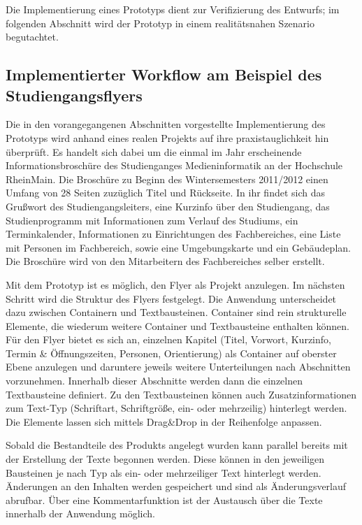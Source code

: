 \secbar

Die Implementierung eines Prototyps dient zur Verifizierung des Entwurfs; im folgenden Abschnitt wird der Prototyp in einem realitätsnahen Szenario begutachtet.

\pagebreak

\subsection{Implementierter Workflow am Beispiel des Studiengangsflyers}

Die in den vorangegangenen Abschnitten vorgestellte Implementierung des Prototyps wird anhand eines realen Projekts auf ihre praxistauglichkeit hin überprüft. Es handelt sich dabei um die einmal im Jahr erscheinende Informationsbroschüre des Studienganges Medieninformatik an der Hochschule RheinMain. Die Broschüre zu Beginn des Wintersemesters 2011/2012 einen Umfang von 28 Seiten zuzüglich Titel und Rückseite. In ihr findet sich das Grußwort des Studiengangsleiters, eine Kurzinfo über den Studiengang, das Studienprogramm mit Informationen zum Verlauf des Studiums, ein Terminkalender, Informationen zu Einrichtungen des Fachbereiches, eine Liste mit Personen im Fachbereich, sowie eine Umgebungskarte und ein Gebäudeplan. Die Broschüre wird von den Mitarbeitern des Fachbereiches selber erstellt.

\bigskip

Mit dem Prototyp ist es möglich, den Flyer als Projekt anzulegen. Im nächsten Schritt wird die Struktur des Flyers festgelegt. Die Anwendung unterscheidet dazu zwischen Containern und Textbausteinen. Container sind rein strukturelle Elemente, die wiederum weitere Container und Textbausteine enthalten können. Für den Flyer bietet es sich an, einzelnen Kapitel (Titel, Vorwort, Kurzinfo, Termin \& Öffnungszeiten, Personen, Orientierung) als Container auf oberster Ebene anzulegen und daruntere jeweils weitere Unterteilungen nach Abschnitten vorzunehmen. Innerhalb dieser Abschnitte werden dann die einzelnen Textbausteine definiert. Zu den Textbausteinen können auch Zusatzinformationen zum Text-Typ (Schriftart, Schriftgröße, ein- oder mehrzeilig) hinterlegt werden. Die Elemente lassen sich mittels Drag\&Drop in der Reihenfolge anpassen.

Sobald die Bestandteile des Produkts angelegt wurden kann parallel bereits mit der Erstellung der Texte begonnen werden. Diese können in den jeweiligen Bausteinen je nach Typ als ein- oder mehrzeiliger Text hinterlegt werden. Änderungen an den Inhalten werden gespeichert und sind als Änderungsverlauf abrufbar. Über eine Kommentarfunktion ist der Austausch über die Texte innerhalb der Anwendung möglich. 

